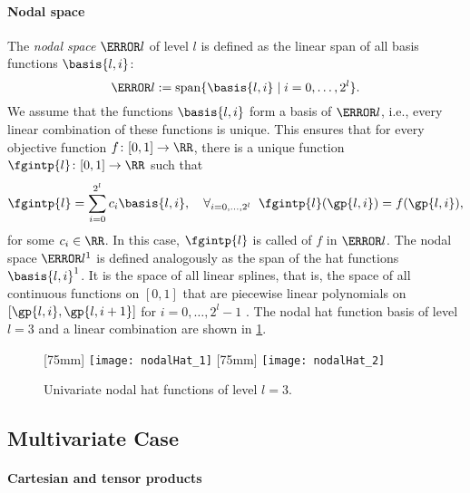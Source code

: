 \paragraph{Nodal space}

The \emph{nodal space} $\ns{l}$ of level $l$
is defined as the linear span of all basis functions
$\basis{l,i}$:
\begin{equation}
  \ns{l} := \spn\{\basis{l,i} \mid i = 0, \dotsc, 2^l\}.
\end{equation}
We assume that the functions $\basis{l,i}$ form a basis of $\ns{l}$, i.e.,
every linear combination of these functions is unique.
This ensures that for every objective function $f\colon [0, 1] \to \RR$,
there is a unique function $\fgintp{l}\colon [0, 1] \to \RR$ such that
\begin{equation}
  \label{eq:interpFullGridUV}
  \fgintp{l}
  = \sum_{i=0}^{2^l} c_i \basis{l,i},\quad
  \fa{i = 0, \dotsc, 2^l}{\fgintp{l}(\gp{l,i}) = f(\gp{l,i})},
\end{equation}
for some $c_i \in \RR$.
In this case, $\fgintp{l}$ is called  of $f$ in $\ns{l}$.
The nodal space $\ns{l}^1$ is defined analogously as the span of the
hat functions $\basis{l,i}^1$.
It is the space of all linear splines,
that is, the space of all continuous functions on $[0, 1]$ that are
piecewise linear polynomials on $[\gp{l,i}, \gp{l,i+1}]$ for
$i = 0, \dotsc, 2^l - 1$ \cite{Hoellig13Approximation}.
The nodal hat function basis of level~$l = 3$
and a linear combination are shown in \cref{fig:nodalHat}.

\begin{figure}
  [75mm]{%
    \texttt{[image: nodalHat\_1]}%
  }%
  \hfill%
  [75mm]{%
    \texttt{[image: nodalHat\_2]}%
  }%
  \caption{Univariate nodal hat functions of level $l = 3$.}
  \label{fig:nodalHat}
\end{figure}



\subsection{Multivariate Case}
\label{sec:212nodalMV}

\paragraph{Cartesian and tensor products}

